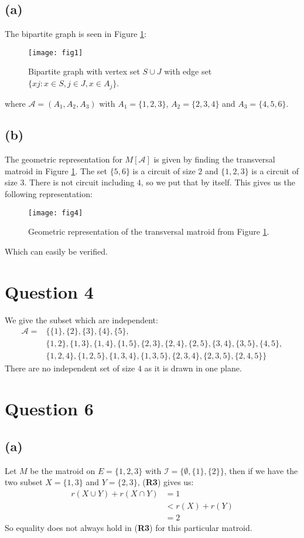 \documentclass[a4paper, fleqn]{article}
\begin{document}
\subsection*{(a)}
The bipartite graph is seen in Figure \ref{fig1}:
\begin{figure}[H]
  \centering
  \texttt{[image: fig1]}
  \caption{Bipartite graph with vertex set $S\cup J$ with edge set $\{xj :x\in S, j\in J,
  x\in A_j\}$.}
  \label{fig1}
\end{figure}
where $\mathcal{A}=(A_1,A_2,A_3)$ with $A_1=\{1,2,3\}$, $A_2=\{2,3,4\}$ and
$A_3=\{4,5,6\}$.

\subsection*{(b)}
The geometric representation for $M[\mathcal{A}]$ is given by finding the transversal
matroid in Figure \ref{fig1}. The set $\{5,6\}$ is a circuit of size $2$ and $\{1,2,3\}$
is a circuit of size $3$. There is not circuit including $4$, so we put that by itself.
This gives us the following representation:
\begin{figure}[H]
  \centering
  \texttt{[image: fig4]}
  \caption{Geometric representation of the transversal matroid from Figure \ref{fig1}.}
  \label{fig4}
\end{figure}
Which can easily be verified.

\section*{Question 4}
We give the subset which are independent:
\begin{align*}
  \mathcal{A}=&\{\{1\},\{2\},\{3\},\{4\},\{5\}, \\
              &\{1,2\},\{1,3\},\{1,4\},\{1,5\},\{2,3\},\{2,4\},\{2,5\},\{3,4\},\{3,5\},\{4,5\},
  \\
&\{1,2,4\},\{1,2,5\},\{1,3,4\},\{1,3,5\},\{2,3,4\},\{2,3,5\},\{2,4,5\}\}
\end{align*}
There are no independent set of size $4$ as it is drawn in one plane.

\section*{Question 6}
\subsection*{(a)}
Let $M$ be the matroid on $E=\{1,2,3\}$ with $\mathcal{I}=\{\emptyset, \{1\},\{2\}\}$,
then if we have the two subset $X=\{1,3\}$ and $Y=\{2,3\}$, (\textbf{R3}) gives us:
\begin{align*}
  r(X\cup Y)+r(X\cap Y)&=1 \\
                       &< r(X)+r(Y) \\
                       &= 2
\end{align*}
So equality does not always hold in (\textbf{R3}) for this particular matroid.
\end{document}
